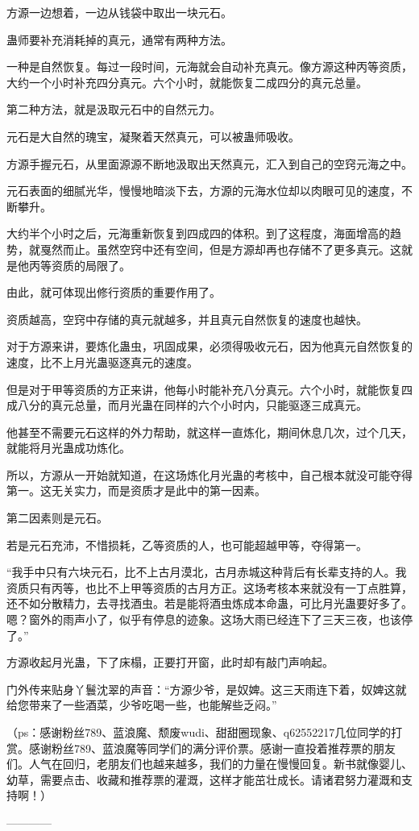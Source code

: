 \begin{this_body}
方源一边想着，一边从钱袋中取出一块元石。

蛊师要补充消耗掉的真元，通常有两种方法。

一种是自然恢复。每过一段时间，元海就会自动补充真元。像方源这种丙等资质，大约一个小时补充四分真元。六个小时，就能恢复二成四分的真元总量。

第二种方法，就是汲取元石中的自然元力。

元石是大自然的瑰宝，凝聚着天然真元，可以被蛊师吸收。

方源手握元石，从里面源源不断地汲取出天然真元，汇入到自己的空窍元海之中。

元石表面的细腻光华，慢慢地暗淡下去，方源的元海水位却以肉眼可见的速度，不断攀升。

大约半个小时之后，元海重新恢复到四成四的体积。到了这程度，海面增高的趋势，就戛然而止。虽然空窍中还有空间，但是方源却再也存储不了更多真元。这就是他丙等资质的局限了。

由此，就可体现出修行资质的重要作用了。

资质越高，空窍中存储的真元就越多，并且真元自然恢复的速度也越快。

对于方源来讲，要炼化蛊虫，巩固成果，必须得吸收元石，因为他真元自然恢复的速度，比不上月光蛊驱逐真元的速度。

但是对于甲等资质的方正来讲，他每小时能补充八分真元。六个小时，就能恢复四成八分的真元总量，而月光蛊在同样的六个小时内，只能驱逐三成真元。

他甚至不需要元石这样的外力帮助，就这样一直炼化，期间休息几次，过个几天，就能将月光蛊成功炼化。

所以，方源从一开始就知道，在这场炼化月光蛊的考核中，自己根本就没可能夺得第一。这无关实力，而是资质才是此中的第一因素。

第二因素则是元石。

若是元石充沛，不惜损耗，乙等资质的人，也可能超越甲等，夺得第一。

“我手中只有六块元石，比不上古月漠北，古月赤城这种背后有长辈支持的人。我资质只有丙等，也比不上甲等资质的古月方正。这场考核本来就没有一丁点胜算，还不如分散精力，去寻找酒虫。若是能将酒虫炼成本命蛊，可比月光蛊要好多了。嗯？窗外的雨声小了，似乎有停息的迹象。这场大雨已经连下了三天三夜，也该停了。”

方源收起月光蛊，下了床榻，正要打开窗，此时却有敲门声响起。

门外传来贴身丫鬟沈翠的声音：“方源少爷，是奴婢。这三天雨连下着，奴婢这就给您带来了一些酒菜，少爷吃喝一些，也能解些乏闷。”

（ps：感谢粉丝789、蓝浪魔、颓废wudi、甜甜圈现象、q62552217几位同学的打赏。感谢粉丝789、蓝浪魔等同学们的满分评价票。感谢一直投着推荐票的朋友们。人气在回归，老朋友们也越来越多，我们的力量在慢慢回复。新书就像婴儿、幼草，需要点击、收藏和推荐票的灌溉，这样才能茁壮成长。请诸君努力灌溉和支持啊！）

------------

\end{this_body}

